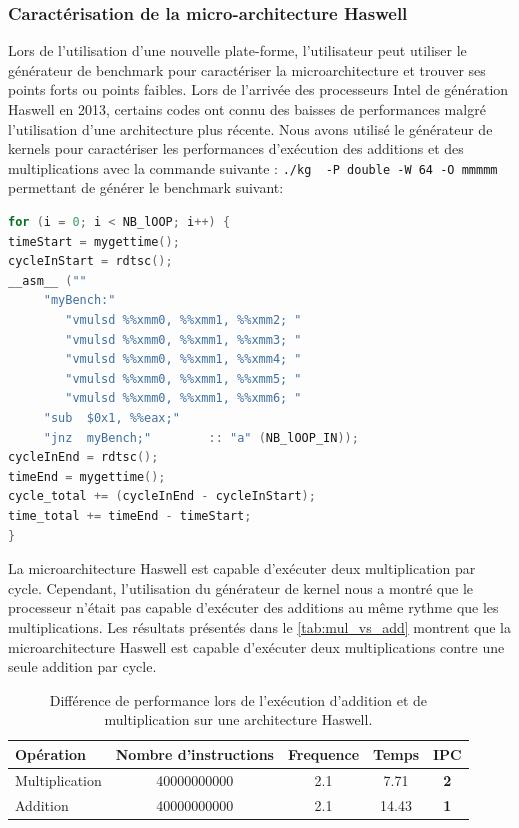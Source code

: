     
    \subsubsection{Caractérisation de la micro-architecture Haswell}
    Lors de l'utilisation d'une nouvelle plate-forme, l'utilisateur peut utiliser le générateur de benchmark pour caractériser la microarchitecture et trouver ses points forts ou points faibles. Lors de l'arrivée des processeurs Intel de génération Haswell en 2013, certains codes ont connu des baisses de performances malgré l'utilisation d'une architecture plus récente. Nous avons utilisé le générateur de kernels pour caractériser les performances d'exécution des additions et des multiplications avec la commande suivante : \verb|./kg  -P double -W 64 -O mmmmm| permettant de générer le benchmark suivant:
    
    \begin{lstlisting}[label=lst:kg_mul ,language=C]
for (i = 0; i < NB_lOOP; i++) {
timeStart = mygettime();
cycleInStart = rdtsc();
__asm__ ("" 
     "myBench:"  
   		"vmulsd %%xmm0, %%xmm1, %%xmm2; "
   		"vmulsd %%xmm0, %%xmm1, %%xmm3; "
   		"vmulsd %%xmm0, %%xmm1, %%xmm4; "
   		"vmulsd %%xmm0, %%xmm1, %%xmm5; "
   		"vmulsd %%xmm0, %%xmm1, %%xmm6; "
     "sub  $0x1, %%eax;"
     "jnz  myBench;"		:: "a" (NB_lOOP_IN));
cycleInEnd = rdtsc();
timeEnd = mygettime();
cycle_total += (cycleInEnd - cycleInStart);
time_total += timeEnd - timeStart;
}
\end{lstlisting}
    
     La microarchitecture Haswell est capable d'exécuter deux multiplication par cycle. Cependant, l'utilisation du générateur de kernel nous a montré que le processeur n'était pas capable d'exécuter des additions au même rythme que les multiplications. Les résultats présentés dans le \autoref{tab:mul_vs_add} montrent que la microarchitecture Haswell est capable d'exécuter deux multiplications contre une seule addition par cycle.

    \begin{table}[h!]
    \centering
    \begin{tabular}{|l|c|c|c|c|}
        \hline
        Opération & Nombre d'instructions & Frequence & Temps & IPC \\ \hline
        Multiplication & 40000000000 & 2.1 & 7.71 & \textbf{2} \\ \hline
        Addition & 40000000000 & 2.1 & 14.43 & {\color[HTML]{963400} \textbf{1}} \\ \hline
        \end{tabular}%
        
        \caption{Différence de performance lors de l'exécution d'addition et de multiplication sur une architecture Haswell.}
        \label{tab:mul_vs_add}
    \end{table}
    
